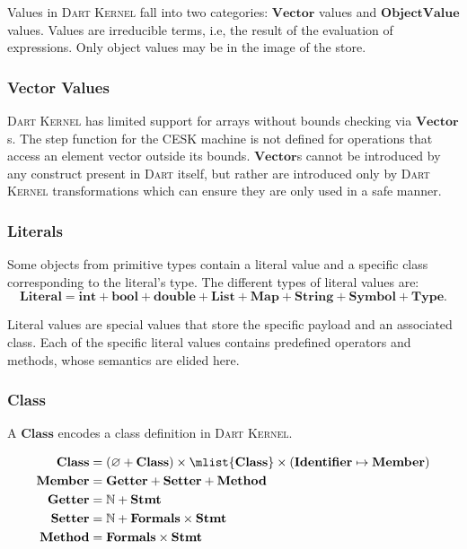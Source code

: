 \documentclass[a4paper,oneside,fleqn]{article}
\newcommand{\kernel}{\textsc{Dart Kernel}}
\newcommand{\dart}{\textsc{Dart}}
\renewcommand{\emptyset}{\varnothing}
\newcommand{\NN}{\mathbb{N}}    %
\newcommand{\dstmt}{\mathbf{Stmt}}
\newcommand{\dlit}{\mathbf{Literal}}
\newcommand{\dobjval}{\mathbf{ObjectValue}}
\newcommand{\dvector}{\mathbf{Vector}}
\newcommand{\dmember}{\mathbf{Member}}
\newcommand{\dident}{\mathbf{Identifier}}
\newcommand{\dtype}{\mathbf{Type}}
\newcommand{\dclass}{\mathbf{Class}}
\newcommand{\dformals}{\mathbf{Formals}}
\newcommand{\dsemint}{\mathbf{int}}
\newcommand{\dsembool}{\mathbf{bool}}
\newcommand{\dsemdouble}{\mathbf{double}}
\newcommand{\dsemlist}{\mathbf{List}}
\newcommand{\dsemmap}{\mathbf{Map}}
\newcommand{\dsemstring}{\mathbf{String}}
\newcommand{\dsemsymbol}{\mathbf{Symbol}}
\begin{document}
Values in \kernel{} fall into two categories: $\dvector$ values and $\dobjval$ values.
Values are irreducible terms, i.e, the result of the evaluation of expressions.
Only object values may be in the image of the store.

\subsubsection{Vector Values}
\label{subsubsec:vector-values}

\kernel{} has limited support for arrays without bounds checking via $\dvector$s.
The step function for the CESK machine is not defined for operations that access an element vector outside its bounds.
$\dvector$s cannot be introduced by any construct present in \dart{} itself, but rather are introduced only by \kernel{} transformations which can ensure they are only used in a safe manner.

\subsubsection{Literals}

Some objects from primitive types contain a literal value and a specific class corresponding to the literal's type.
The different types of literal values are:
\[\dlit = \dsemint + \dsembool + \dsemdouble + \dsemlist + \dsemmap + \dsemstring + \dsemsymbol + \dtype.\]

Literal values are special values that store the specific payload and an associated class.
Each of the specific literal values contains predefined operators and methods, whose semantics are elided here.

\subsubsection{Class}
\label{subsubsec:class}

A $\dclass$ encodes a class definition in \kernel{}.

\begin{align*}
\dclass &= (\emptyset + \dclass) \times \mlist{\dclass} \times (\dident \mapsto \dmember)\\
\dmember &= \mathbf{Getter} + \mathbf{Setter} + \mathbf{Method} \\
\mathbf{Getter} &= \NN + \dstmt \\
\mathbf{Setter} &= \NN + \dformals \times \dstmt \\
\mathbf{Method} &= \dformals \times \dstmt
\end{align*}
\end{document}
